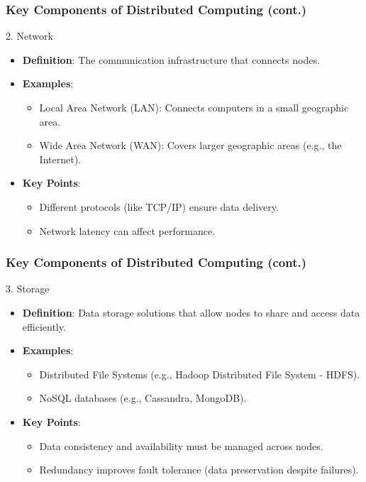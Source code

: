 \documentclass[aspectratio=169]{beamer}
\begin{document}
\begin{frame}[fragile]
    \frametitle{Key Components of Distributed Computing (cont.)}
    \begin{block}{2. Network}
        \begin{itemize}
            \item \textbf{Definition}: The communication infrastructure that connects nodes.
            \item \textbf{Examples}:
            \begin{itemize}
                \item Local Area Network (LAN): Connects computers in a small geographic area.
                \item Wide Area Network (WAN): Covers larger geographic areas (e.g., the Internet).
            \end{itemize}
            \item \textbf{Key Points}:
            \begin{itemize}
                \item Different protocols (like TCP/IP) ensure data delivery.
                \item Network latency can affect performance.
            \end{itemize}
        \end{itemize}
    \end{block}
\end{frame}

\begin{frame}[fragile]
    \frametitle{Key Components of Distributed Computing (cont.)}
    \begin{block}{3. Storage}
        \begin{itemize}
            \item \textbf{Definition}: Data storage solutions that allow nodes to share and access data efficiently.
            \item \textbf{Examples}:
            \begin{itemize}
                \item Distributed File Systems (e.g., Hadoop Distributed File System - HDFS).
                \item NoSQL databases (e.g., Cassandra, MongoDB).
            \end{itemize}
            \item \textbf{Key Points}:
            \begin{itemize}
                \item Data consistency and availability must be managed across nodes.
                \item Redundancy improves fault tolerance (data preservation despite failures).
            \end{itemize}
        \end{itemize}
    \end{block}
\end{frame}
\end{document}
